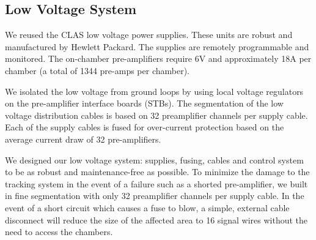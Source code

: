  
\subsection{Low Voltage System}
We reused the CLAS low voltage power supplies.  
These units are robust and manufactured by Hewlett Packard.  
The supplies are remotely programmable and monitored.  The on-chamber 
pre-amplifiers require 6V and approximately 18A per chamber
(a total of 1344 pre-amps per chamber).  

We isolated the low voltage from 
ground loops by using local voltage regulators on the pre-amplifier interface 
boards (STBs).  The segmentation of the low voltage distribution cables is 
based on 32 preamplifier channels per supply cable.  Each of the supply 
cables is fused for over-current 
protection based on the average current draw of 32 pre-amplifiers.  

We designed our low voltage system: supplies, fusing, cables and control
system to be as robust and maintenance-free as possible.  To minimize
the damage to the tracking system in the event of a failure such as
a shorted pre-amplifier, we built in fine segmentation with only
32 preamplifier channels per supply cable. 
In the event of a short circuit which causes a fuse to blow,
a simple, external cable disconnect will reduce the size of the affected
area to 16 signal wires without the need to access the chambers.

